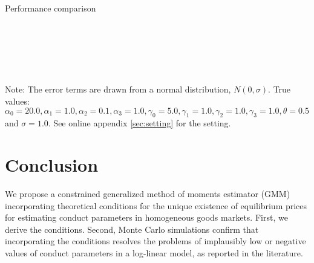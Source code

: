\documentclass[11pt, a4paper]{article}
\theoremstyle{remark}
\begin{document}
\begin{table}[!htbp]
  \begin{center}
  \caption{Performance comparison}
    \label{tb:loglinear_loglinear_sigma_1_simultaneous_non_constraint_theta_constraint_bias_rmse} 
  \\[0.5em]
  \begin{adjustbox}{width=\textwidth}
    
  \end{adjustbox}

  \vspace{1em}

  \\[0.5em]
  \begin{adjustbox}{width=\textwidth}
    
  \end{adjustbox}

  \vspace{1em}

  \\[0.5em]
  \begin{adjustbox}{width=\textwidth}
    
  \end{adjustbox}
  \end{center}
  \footnotesize
  Note: The error terms are drawn from a normal distribution, $N(0, \sigma)$. True values: $\alpha_0=20.0, \alpha_1=1.0, \alpha_2=0.1, \alpha_3=1.0, \gamma_0=5.0, \gamma_1=1.0, \gamma_2=1.0, \gamma_3=1.0, \theta=0.5$ and $\sigma=1.0$. See online appendix \ref{sec:setting} for the setting.
\end{table}



\section{Conclusion}
We propose a constrained generalized method of moments estimator (GMM) incorporating theoretical conditions for the unique existence of equilibrium prices for estimating conduct parameters in homogeneous goods markets.
First, we derive the conditions.
Second, Monte Carlo simulations confirm that incorporating the conditions resolves the problems of implausibly low or negative values of conduct parameters in a log-linear model, as reported in the literature. 
\end{document}

